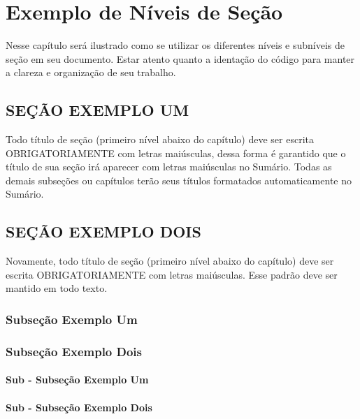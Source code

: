 \documentclass[
  12pt,		%
  a4paper,	%
  openright,%
  oneside,	%
  chapter=TITLE,		%
  section=TITLE,		%
  english,	%
  french,	%
  spanish,	%
  brazil
]{abntex2}
\begin{document}
    \chapter {Exemplo de Níveis de Seção}
    
        Nesse capítulo será ilustrado como se utilizar os diferentes níveis e subníveis de seção em seu documento. Estar atento quanto a identação do código para manter a clareza e organização de seu trabalho.
        
            \section{SEÇÃO EXEMPLO UM}
            Todo título de seção (primeiro nível abaixo do capítulo) deve ser escrita OBRIGATORIAMENTE com letras maiúsculas, dessa forma é garantido que o título de sua seção irá aparecer com letras maiúsculas no Sumário. Todas as demais subseções ou capítulos terão seus títulos formatados automaticamente no Sumário.
            
            \section{SEÇÃO EXEMPLO DOIS}
            Novamente, todo título de seção (primeiro nível abaixo do capítulo) deve ser escrita OBRIGATORIAMENTE com letras maiúsculas. Esse padrão deve ser mantido em todo texto.
            
                \subsection{Subseção Exemplo Um}
                \lipsum[8]
                
                \subsection{Subseção Exemplo Dois}
                \lipsum[7]
                
                    \subsubsection{Sub - Subseção Exemplo Um}
                    \lipsum[6]
                    
                    \subsubsection{Sub - Subseção Exemplo Dois}
                    \lipsum[12]
                    
\end{document}

